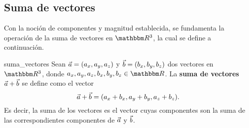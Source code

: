 \subsection{Suma de vectores}

Con la noción de componentes y magnitud establecida, se fundamenta la operación de la suma de vectores en $\RR[3]$, la cual se define a continuación.

\begin{definition}{}{suma_vectores}
    Sean $\vec{a} = (a_x, a_y, a_z)$ y $\vec{b} = (b_x, b_y, b_z)$ dos vectores en $\RR[3]$, donde $a_x, a_y, a_z, b_x, b_y, b_z \in \RR$. La \textbf{suma de vectores} $\vec{a} + \vec{b}$ se define como el vector
    $$\vec{a} + \vec{b} = (a_x + b_x, a_y + b_y, a_z + b_z).$$
    Es decir, la suma de los vectores es el vector cuyas componentes son la suma de las correspondientes componentes de $\vec{a}$ y $\vec{b}$.
\end{definition}

